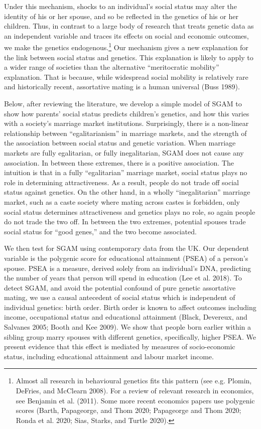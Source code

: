 \documentclass[
]{article}
\begin{document}
Under this mechanism, shocks to an individual's social status may alter
the identity of his or her spouse, and so be reflected in the genetics
of his or her children. Thus, in contrast to a large body of research
that treats genetic data as an independent variable and traces its
effects on social and economic outcomes, we make the genetics
endogenous.\footnote{Almost all research in behavioural genetics fits this pattern (see
  e.g. Plomin, DeFries, and McClearn 2008). For a review of relevant research in
  economics, see Benjamin et al. (2011). Some more recent economics
  papers use polygenic scores (Barth, Papageorge, and Thom 2020; Papageorge and Thom 2020; Ronda et al. 2020; Sias, Starks, and Turtle 2020).} Our mechanism gives a new explanation for the link
between social status and genetics. This explanation is likely to apply
to a wider range of societies than the alternative ``meritocratic
mobility'' explanation. That is because, while widespread social mobility
is relatively rare and historically recent, assortative mating is a
human universal (Buss 1989).

Below, after reviewing the literature, we develop a simple model of SGAM
to show how parents' social status predicts children's genetics, and how
this varies with a society's marriage market institutions. Surprisingly,
there is a non-linear relationship between ``egalitarianism'' in marriage
markets, and the strength of the association between social status and
genetic variation. When marriage markets are fully egalitarian, or fully
inegalitarian, SGAM does not cause any association. In between these
extremes, there is a positive association. The intuition is that in a
fully ``egalitarian'' marriage market, social status plays no role in
determining attractiveness. As a result, people do not trade off social
status against genetics. On the other hand, in a wholly ``inegalitarian''
marriage market, such as a caste society where mating across castes is
forbidden, only social status determines attractiveness and genetics
plays no role, so again people do not trade the two off. In between the
two extremes, potential spouses trade social status for ``good genes,''
and the two become associated.

We then test for SGAM using contemporary data from the UK. Our dependent
variable is the polygenic score for educational attainment (PSEA) of a
person's spouse. PSEA is a measure, derived solely from an individual's
DNA, predicting the number of years that person will spend in education
(Lee et al. 2018). To detect SGAM, and avoid the potential confound of pure
genetic assortative mating, we use a causal antecedent of social status
which is independent of individual genetics: birth order. Birth order is
known to affect outcomes including income, occupational status and
educational attainment (Black, Devereux, and Salvanes 2005; Booth and Kee 2009). We show that
people born earlier within a sibling group marry spouses with different
genetics, specifically, higher PSEA. We present evidence that this
effect is mediated by measures of socio-economic status, including
educational attainment and labour market income.
\end{document}
